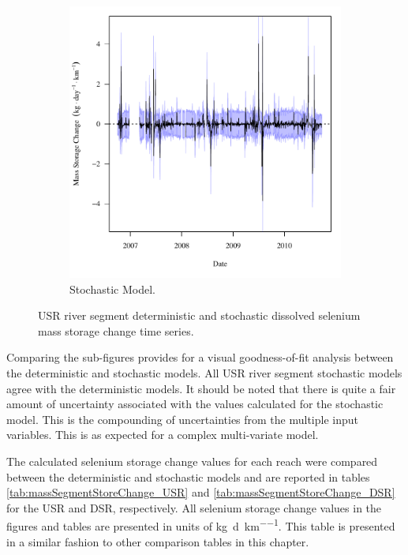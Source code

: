 \begin{landscape}
\begin{figure}
\begin{subfigure}{0.7\textwidth}
			\includegraphics[width=\tableCustomSize]{"Figures/Results_DSR/Stochastic/f Segment G"}
			\caption{Stochastic Model.}
		\end{subfigure}
		\caption{USR river segment deterministic and stochastic dissolved selenium mass storage change time series.}
	\end{figure}
\end{landscape}
\subfiguretop

Comparing the sub-figures provides for a visual goodness-of-fit analysis between the deterministic and stochastic models.  All USR river segment stochastic models agree with the deterministic models.  It should be noted that there is quite a fair amount of uncertainty associated with the values calculated for the stochastic model.  This is the compounding of uncertainties from the multiple input variables.  This is as expected for a complex multi-variate model.

The calculated selenium storage change values for each reach were compared between the deterministic and stochastic models and are reported in tables \ref{tab:massSegmentStoreChange_USR} and \ref{tab:massSegmentStoreChange_DSR} for the USR and DSR, respectively.  All selenium storage change values in the figures and tables are presented in units of \si{\kilo\gram\per\day\per\kilo\meter}.  This table is presented in a similar fashion to other comparison tables in this chapter.

